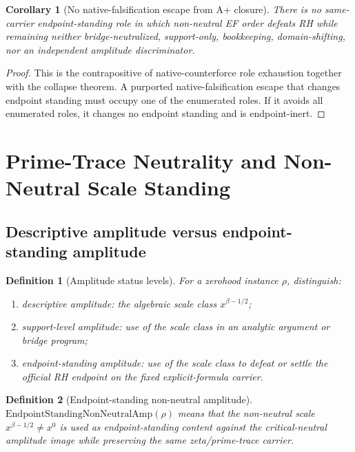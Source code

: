 \documentclass[11pt]{article}
\newtheorem{definition}{Definition}[section]
\newtheorem{corollary}{Corollary}[section]
\newcommand{\AmpStand}{\mathrm{EndpointStandingNonNeutralAmp}}
\begin{document}
\begin{corollary}[No native-falsification escape from A+ closure]
There is no same-carrier endpoint-standing role in which non-neutral EF order defeats RH while remaining neither bridge-neutralized, support-only, bookkeeping, domain-shifting, nor an independent amplitude discriminator.
\end{corollary}

\begin{proof}
This is the contrapositive of native-counterforce role exhaustion together with the collapse theorem.  A purported native-falsification escape that changes endpoint standing must occupy one of the enumerated roles.  If it avoids all enumerated roles, it changes no endpoint standing and is endpoint-inert.
\end{proof}

\section{Prime-Trace Neutrality and Non-Neutral Scale Standing}

\subsection{Descriptive amplitude versus endpoint-standing amplitude}

\begin{definition}[Amplitude status levels]
For a zerohood instance \(\rho\), distinguish:
\begin{enumerate}
\item \emph{descriptive amplitude}: the algebraic scale class \(x^{\beta-1/2}\);
\item \emph{support-level amplitude}: use of the scale class in an analytic argument or bridge program;
\item \emph{endpoint-standing amplitude}: use of the scale class to defeat or settle the official RH endpoint on the fixed explicit-formula carrier.
\end{enumerate}
\end{definition}

\begin{definition}[Endpoint-standing non-neutral amplitude]
\(\AmpStand(\rho)\) means that the non-neutral scale \(x^{\beta-1/2}\ne x^0\) is used as endpoint-standing content against the critical-neutral amplitude image while preserving the same zeta/prime-trace carrier.
\end{definition}
\end{document}
